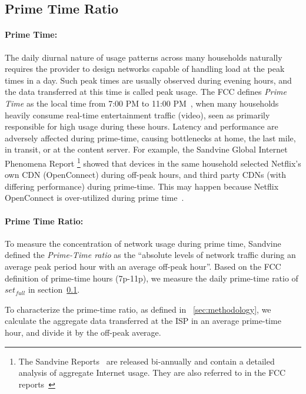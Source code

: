 \subsection{Prime Time Ratio} \label{subsec:primetime}

\paragraph{Prime Time: }The daily diurnal nature of usage patterns across many
households naturally requires the provider to design networks capable of handling 
load at the peak times in a day. Such peak times are usually observed during
evening hours, and the data transferred at this time is called peak usage.
The FCC defines \emph{Prime Time} as the local time from 7:00 PM to 11:00
PM~\cite{fcc2014measuring-broadband}, when many
households heavily consume real-time entertainment traffic (video), seen as primarily
responsible for high usage during these hours. Latency and performance are adversely
affected during prime-time, causing bottlenecks at home, the last mile, in
transit, or at the content server. For example, the Sandvine Global
Internet Phenomena Report \footnote{The Sandvine Reports ~\cite{sandvine20141h,
sandvine20142h}are released bi-annually and
contain a detailed analysis of aggregate Internet usage. They are also referred
to in the FCC reports~\cite{fcc2015progress-report, fcc2014measuring-broadband,
fcc2014progress-report}} showed that devices in the same household selected Netflix's
own CDN (OpenConnect) during off-peak hours, and third party CDNs (with differing
performance) during prime-time. This may happen because Netflix OpenConnect is over-utilized
during prime time~\cite{sandvine20141h}.

\paragraph{Prime Time Ratio: }To measure the concentration of network usage during prime time,
Sandvine defined the \emph{Prime-Time ratio} as the ``absolute levels of network traffic
during an average peak period hour with an average off-peak hour''. Based on the FCC
definition of prime-time hours (7p-11p), we measure the daily prime-time ratio of $set_{full}$
in section~\ref{subsec:primetime}.

To characterize the prime-time ratio, as defined in ~\ref{sec:methodology}, we
calculate the aggregate data transferred at the ISP in an average prime-time hour,
and divide it by the off-peak average.


